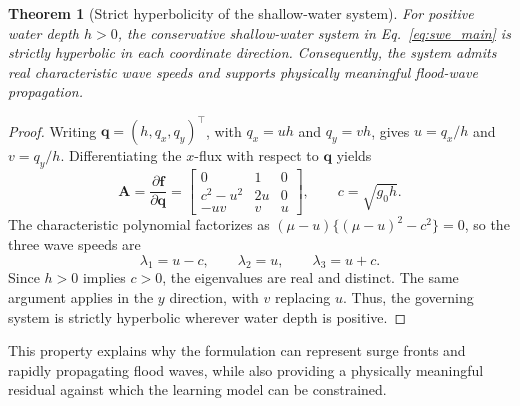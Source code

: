 \documentclass[pdflatex,sn-mathphys-ay]{sn-jnl}
\theoremstyle{thmstyleone}
\newtheorem{theorem}{Theorem}
\begin{document}
\begin{theorem}[Strict hyperbolicity of the shallow-water system]
\label{thm:swe_hyperbolicity}
For positive water depth $h>0$, the conservative shallow-water system
in Eq.~\eqref{eq:swe_main} is strictly hyperbolic in each coordinate
direction.  Consequently, the system admits real characteristic wave
speeds and supports physically meaningful flood-wave propagation.
\end{theorem}

\begin{proof}
Writing $\mathbf{q}=(h,q_x,q_y)^\top$, with $q_x=uh$ and $q_y=vh$,
gives $u=q_x/h$ and $v=q_y/h$.  Differentiating the $x$-flux with
respect to $\mathbf{q}$ yields
\begin{equation}
  \mathbf{A}
  =
  \frac{\partial\mathbf{f}}{\partial\mathbf{q}}
  =
  \begin{bmatrix}
    0 & 1 & 0 \\
    c^{2}-u^{2} & 2u & 0 \\
    -uv & v & u
  \end{bmatrix},
  \qquad
  c=\sqrt{g_{0}h}.
  \label{eq:jacobian}
\end{equation}
The characteristic polynomial factorizes as
$(\mu-u)\{(\mu-u)^2-c^2\}=0$, so the three wave speeds are
\begin{equation}
  \lambda_1=u-c,
  \qquad
  \lambda_2=u,
  \qquad
  \lambda_3=u+c.
  \label{eq:eigenvalues}
\end{equation}
Since $h>0$ implies $c>0$, the eigenvalues are real and distinct.
The same argument applies in the $y$ direction, with $v$ replacing
$u$.  Thus, the governing system is strictly hyperbolic wherever water
depth is positive.
\end{proof}

This property explains why the formulation can represent surge fronts
and rapidly propagating flood waves, while also providing a physically
meaningful residual against which the learning model can be
constrained.

\end{document}
